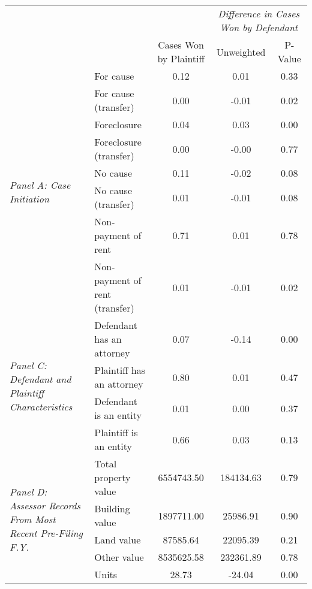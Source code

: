 \begin{tabular}{llccc}
\toprule
 &  & \textit{} & \multicolumn{2}{c}{\textit{Difference in Cases Won by Defendant}} \\
 &  & Cases Won by Plaintiff & Unweighted & P-Value \\
\midrule
\multirow[c]{8}{4cm}{\textit{Panel A: Case Initiation}} & For cause & 0.12 & 0.01 & 0.33 \\
 & For cause (transfer) & 0.00 & -0.01 & 0.02 \\
 & Foreclosure & 0.04 & 0.03 & 0.00 \\
 & Foreclosure (transfer) & 0.00 & -0.00 & 0.77 \\
 & No cause & 0.11 & -0.02 & 0.08 \\
 & No cause (transfer) & 0.01 & -0.01 & 0.08 \\
 & Non-payment of rent & 0.71 & 0.01 & 0.78 \\
 & Non-payment of rent (transfer) & 0.01 & -0.01 & 0.02 \\
\cline{1-5}
\multirow[c]{4}{4cm}{\textit{Panel C: Defendant and Plaintiff Characteristics}} & Defendant has an attorney & 0.07 & -0.14 & 0.00 \\
 & Plaintiff has an attorney & 0.80 & 0.01 & 0.47 \\
 & Defendant is an entity & 0.01 & 0.00 & 0.37 \\
 & Plaintiff is an entity & 0.66 & 0.03 & 0.13 \\
\cline{1-5}
\multirow[c]{5}{4cm}{\textit{Panel D: Assessor Records From Most Recent Pre-Filing F.Y.}} & Total property value & 6554743.50 & 184134.63 & 0.79 \\
 & Building value & 1897711.00 & 25986.91 & 0.90 \\
 & Land value & 87585.64 & 22095.39 & 0.21 \\
 & Other value & 8535625.58 & 232361.89 & 0.78 \\
 & Units & 28.73 & -24.04 & 0.00 \\
\cline{1-5}
\bottomrule
\end{tabular}
